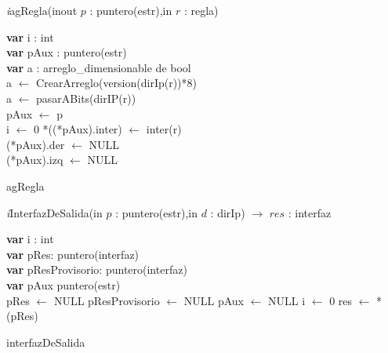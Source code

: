 \textit{i}agRegla(inout $p$ : puntero(estr),in $r$ : regla)\\
\begin{algorithm}[H]
\BlankLine
\textbf{var} i : int\\
\textbf{var} pAux : puntero(estr) 	\\
\textbf{var} a : arreglo\_dimensionable de bool\\
\BlankLine 
a $\leftarrow$ CrearArreglo(version(dirIp(r))*8)\\
\BlankLine
{}
\BlankLine 
a $\leftarrow$ pasarABits(dirIP(r))\\
pAux $\leftarrow$ p\\
i $\leftarrow$ 0
\BlankLine 
{}
\BlankLine 
{}
\BlankLine 
*((*pAux).inter) $\leftarrow$ inter(r)\\
(*pAux).der $\leftarrow$ NULL\\
(*pAux).izq $\leftarrow$ NULL
\caption{agRegla}
\end{algorithm}


\textit{i}InterfazDeSalida(in $p$ : puntero(estr),in $d$ : dirIp)   $\longrightarrow$	$res$ : interfaz\\
\begin{algorithm}[H]
\BlankLine
\textbf{var} i : int\\
\textbf{var} pRes: puntero(interfaz)\\
\textbf{var} pResProvisorio: puntero(interfaz)\\
\textbf{var} pAux puntero(estr) 	\\
pRes $\leftarrow$ NULL
pResProvisorio $\leftarrow$ NULL
pAux $\leftarrow$ NULL
i $\leftarrow$ 0
\BlankLine 
{}
res $\leftarrow$ *(pRes)
\caption{interfazDeSalida}
\end{algorithm}


